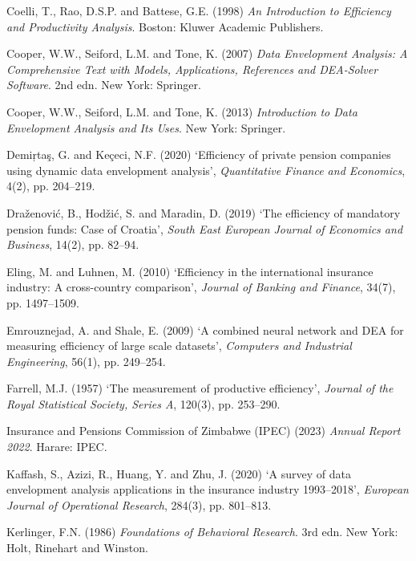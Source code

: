 \documentclass[12pt,a4paper]{article}
\begin{document}
\begin{description}[style=nextline, leftmargin=0pt, labelwidth=0pt, itemsep=0.5em]
\item Coelli, T., Rao, D.S.P. and Battese, G.E. (1998) \textit{An Introduction to Efficiency and Productivity Analysis}. Boston: Kluwer Academic Publishers.

\item Cooper, W.W., Seiford, L.M. and Tone, K. (2007) \textit{Data Envelopment Analysis: A Comprehensive Text with Models, Applications, References and DEA-Solver Software}. 2nd edn. New York: Springer.

\item Cooper, W.W., Seiford, L.M. and Tone, K. (2013) \textit{Introduction to Data Envelopment Analysis and Its Uses}. New York: Springer.

\item Demi\c{r}ta\c{s}, G. and Ke\c{c}eci, N.F. (2020) `Efficiency of private pension companies using dynamic data envelopment analysis', \textit{Quantitative Finance and Economics}, 4(2), pp. 204--219.

\item Dra\v{z}enovi\'{c}, B., Hod\v{z}i\'{c}, S. and Maradin, D. (2019) `The efficiency of mandatory pension funds: Case of Croatia', \textit{South East European Journal of Economics and Business}, 14(2), pp. 82--94.

\item Eling, M. and Luhnen, M. (2010) `Efficiency in the international insurance industry: A cross-country comparison', \textit{Journal of Banking and Finance}, 34(7), pp. 1497--1509.

\item Emrouznejad, A. and Shale, E. (2009) `A combined neural network and DEA for measuring efficiency of large scale datasets', \textit{Computers and Industrial Engineering}, 56(1), pp. 249--254.

\item Farrell, M.J. (1957) `The measurement of productive efficiency', \textit{Journal of the Royal Statistical Society, Series A}, 120(3), pp. 253--290.

\item Insurance and Pensions Commission of Zimbabwe (IPEC) (2023) \textit{Annual Report 2022}. Harare: IPEC.

\item Kaffash, S., Azizi, R., Huang, Y. and Zhu, J. (2020) `A survey of data envelopment analysis applications in the insurance industry 1993--2018', \textit{European Journal of Operational Research}, 284(3), pp. 801--813.

\item Kerlinger, F.N. (1986) \textit{Foundations of Behavioral Research}. 3rd edn. New York: Holt, Rinehart and Winston.


\end{description}
\end{document}
